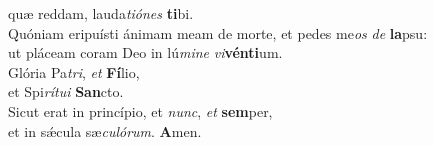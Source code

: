\evenverse quæ reddam, lauda\textit{ti}\textit{ó}\textit{nes} \textbf{ti}bi.\\
\oddverse Quóniam eripuísti ánimam meam de morte, et pedes me\textit{os} \textit{de} \textbf{la}psu:~\*\\
\oddverse ut pláceam coram Deo in lú\textit{mi}\textit{ne} \textit{vi}\textbf{vén}\textbf{ti}um.\\
\evenverse Glória Pa\textit{tri}, \textit{et} \textbf{Fí}lio,~\*\\
\evenverse et Spi\textit{rí}\textit{tu}\textit{i} \textbf{San}cto.\\
\oddverse Sicut erat in princípio, et \textit{nunc}, \textit{et} \textbf{sem}per,~\*\\
\oddverse et in sǽcula sæ\textit{cu}\textit{ló}\textit{rum}. \textbf{A}men.\\
